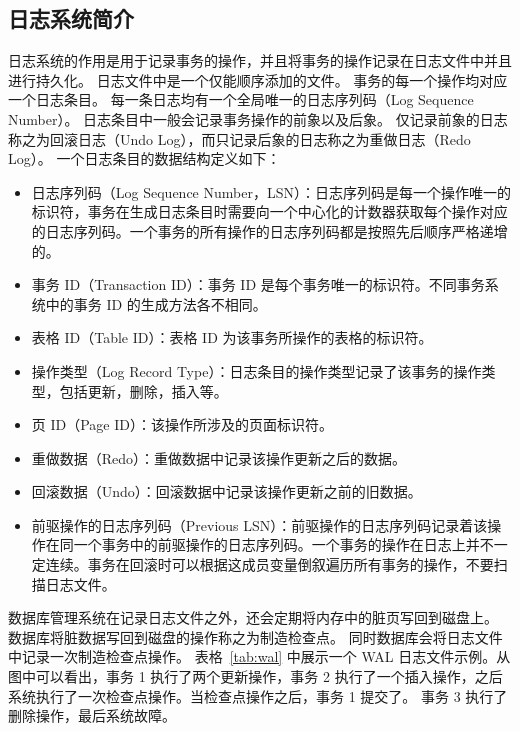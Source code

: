 \subsection{日志系统简介}

日志系统的作用是用于记录事务的操作，并且将事务的操作记录在日志文件中并且进行持久化。
日志文件中是一个仅能顺序添加的文件。
事务的每一个操作均对应一个日志条目。
每一条日志均有一个全局唯一的日志序列码（Log Sequence Number）。
日志条目中一般会记录事务操作的前象以及后象。
仅记录前象的日志称之为回滚日志（Undo Log），而只记录后象的日志称之为重做日志（Redo Log）。
一个日志条目的数据结构定义如下：
\begin{itemize}
    \item 日志序列码（Log Sequence Number，LSN）：日志序列码是每一个操作唯一的标识符，事务在生成日志条目时需要向一个中心化的计数器获取每个操作对应的日志序列码。一个事务的所有操作的日志序列码都是按照先后顺序严格递增的。
    \item 事务 ID（Transaction ID）：事务 ID 是每个事务唯一的标识符。不同事务系统中的事务 ID 的生成方法各不相同。
    \item 表格 ID（Table ID）：表格 ID 为该事务所操作的表格的标识符。
    \item 操作类型（Log Record Type）：日志条目的操作类型记录了该事务的操作类型，包括更新，删除，插入等。
    \item 页 ID（Page ID）：该操作所涉及的页面标识符。
    \item 重做数据（Redo）：重做数据中记录该操作更新之后的数据。
    \item 回滚数据（Undo）：回滚数据中记录该操作更新之前的旧数据。
    \item 前驱操作的日志序列码（Previous LSN）：前驱操作的日志序列码记录着该操作在同一个事务中的前驱操作的日志序列码。一个事务的操作在日志上并不一定连续。事务在回滚时可以根据这成员变量倒叙遍历所有事务的操作，不要扫描日志文件。
\end{itemize}


数据库管理系统在记录日志文件之外，还会定期将内存中的脏页写回到磁盘上。
数据库将脏数据写回到磁盘的操作称之为制造检查点。
同时数据库会将日志文件中记录一次制造检查点操作。
表格~\ref{tab:wal} 中展示一个 WAL 日志文件示例。从图中可以看出，事务 1 执行了两个更新操作，事务 2 执行了一个插入操作，之后系统执行了一次检查点操作。当检查点操作之后，事务 1 提交了。
事务 3 执行了删除操作，最后系统故障。


